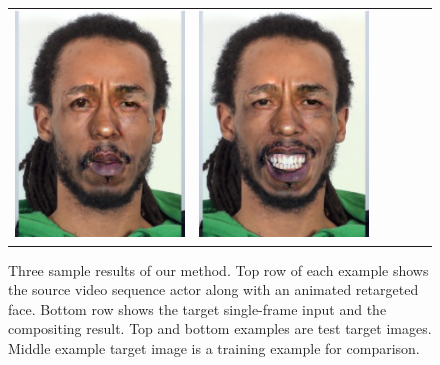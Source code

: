 \begin{figure}
\begin{tabular}{cccccc}
\includegraphics[width=.1535\textwidth]{figures/results/marley_on_tidus_new/v2/composite000008.png}&
\includegraphics[width=.1535\textwidth]{figures/results/marley_on_tidus_new/v2/composite000004.png}\\

\end{tabular}
\label{fig:result}
\caption{Three sample results of our method.  Top row of each example shows the source video sequence actor along with an animated retargeted face.  Bottom row shows the target single-frame input and the compositing result.  Top and bottom examples are test target images.  Middle example target image is a training example for comparison.}
\end{figure}
